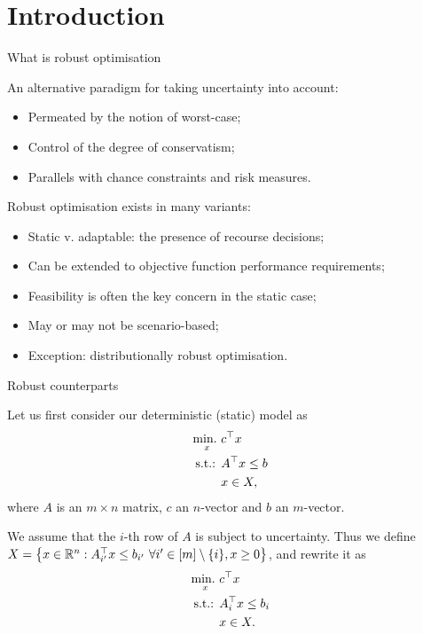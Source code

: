 \section{Introduction}


\begin{frame}{What is robust optimisation}

	An alternative paradigm for taking uncertainty into account:
	\begin{itemize}
		\item Permeated by the notion of \alert{worst-case};
		\item Control of the degree of \alert{conservatism};	
		\item Parallels with \alert{chance constraints} and \alert{risk measures}.
	\end{itemize}
	
	\pause
	Robust optimisation exists in many variants:
	\begin{itemize}
		\item Static v. adaptable: the presence of \alert{recourse decisions};
		\item Can be extended to \alert{objective function} performance requirements;
		\item \alert{Feasibility} is often the key concern in the static case;
		\item May or may not be \alert{scenario-based};
		\item Exception: distributionally robust optimisation.	
	\end{itemize}
	
\end{frame}


\begin{frame}{Robust counterparts}

	Let us first consider our deterministic (static) model as
	\begin{align*}
		\mathop{\text{min.} \ }_x & c^\top x \\
		\text{s.t.: } & A^\top x \le b \\
			  		  & x \in X,
	\end{align*}	
	where $A$ is an $m \times n$ matrix, $c$ an $n$-vector and $b$ an $m$-vector.
	
	\pause
	We assume that the $i$-th row of $A$ is \alert{subject to uncertainty}.
	Thus we define $X = \left\{ x \in \mathbb R^n : A_{i'}^\top x \le b_{i'} \ \forall i' \in [m] \setminus \{i\}, x \ge 0 \right \}$, and rewrite it as
	\begin{align*}
		\mathop{\text{min.} \ }_x & c^\top x \\
		\text{s.t.: } & A_i^\top x \le b_i \\
		& x \in X.	
	\end{align*}	

\end{frame}

